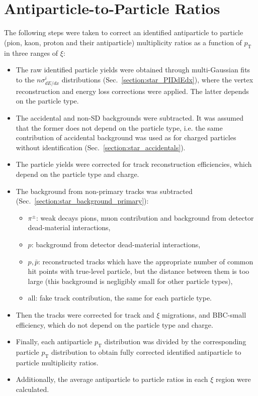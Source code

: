 \section{Antiparticle-to-Particle Ratios}\label{section:star_ratios}
The following steps were taken to correct an  identified antiparticle to particle (pion, kaon, proton and their antiparticle) multiplicity ratios as a function of $p_\textrm{T}$ in three ranges of $\xi$:
\begin{itemize}
	\item The raw identified particle yields were obtained through multi-Gaussian fits to the $n\sigma^i_{dE/dx}$ distributions (Sec.~\ref{section:star_PIDdEdx}), where the vertex reconstruction and energy loss corrections were applied. The latter depends on the particle type.
	\item The accidental and non-SD backgrounds were subtracted. It was assumed that the former does not depend on the particle type, i.e. the same contribution of accidental background was used as for charged particles without identification (Sec.~\ref{section:star_accidentals}).
	\item The particle yields were corrected for track reconstruction efficiencies, which depend on the particle type and charge.
	\item The background from non-primary tracks was subtracted (Sec.~\ref{section:star_background_primary}):
	\begin{itemize}
		\item $\pi^\pm$: weak decays pions, muon contribution and background from  detector dead-material interactions,
		\item $p$: background from  detector dead-material interactions,
		\item $p,\bar{p}$: reconstructed tracks which have the appropriate number of common hit points with true-level particle, but the distance between them is too large (this background is negligibly small for other particle types),
		\item all: fake track contribution, the same for each particle type. 
	\end{itemize}
	\item Then the tracks were corrected for track and $\xi$ migrations, and BBC-small efficiency, which do not depend on the particle type and charge.
	\item Finally, each antiparticle $p_\textrm{T}$ distribution was divided by the corresponding particle $p_\textrm{T}$ distribution to obtain fully corrected identified antiparticle to particle multiplicity ratios.
	\item Additionally, the average antiparticle to particle ratios in each $\xi$ region were calculated.
\end{itemize}